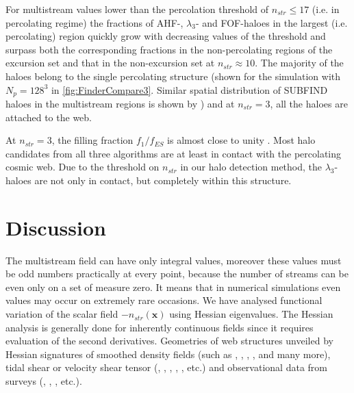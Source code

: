 For multistream values lower than the percolation threshold of $n_{str} \le 17$ (i.e. in percolating regime) the fractions of AHF-, $\lambda_3$-  and FOF-haloes in the largest (i.e. percolating) region quickly grow with decreasing values of the threshold and surpass both the corresponding fractions in the non-percolating  regions of the excursion set and that in the non-excursion set
at $n_{str} \approx 10$. The majority of the haloes belong to the single percolating structure (shown for the simulation with $N_p=128^3$ in \autoref{fig:FinderCompare3}. Similar spatial distribution of SUBFIND haloes \citealt{Springel2001a} in the multistream regions is shown by \citealt{Aragon-Calvo2016}) and at $n_{str} = 3$, all the haloes are attached to the web.  

At $n_{str} = 3$, the filling fraction $f_1 / f_{ES}$ is almost close to unity \cite{Ramachandra2017}. Most halo candidates from all three algorithms are at least in contact with the percolating cosmic web. Due to the threshold on $n_{str}$ in our halo detection method, the $\lambda_3$-haloes are not only in contact, but completely within this structure. 



\section{Discussion}
\label{sec:discussion}



The multistream field can have only integral  values, moreover these values must be odd numbers practically at every point, because the number of streams can be even only on a set of measure zero. It means that in numerical simulations  even values may occur on extremely rare occasions. 
We have analysed functional variation of the scalar field $-n_{str}(\mathbf{x})$ using Hessian eigenvalues. The Hessian analysis is generally done for inherently continuous fields since it requires  evaluation of the second derivatives. %
Geometries of web structures unveiled by Hessian signatures of smoothed density fields (such as \citealt{Sousbie2008a}, \citealt{Aragon-Calvo2007}, \citealt{Aragon-Calvo2010a}, \citealt{Cautun2014a}, \citealt{Bond2010a} and many more), tidal shear or velocity shear tensor (\citealt{Hahn2007}, \citealt{Forero-Romero2009a}, \citealt{Hoffman2012a}, \citealt{Hoffman2012a}, \citealt{Libeskind2013}, \citealt{Cautun2014a} etc.) and observational data from surveys (\citealt{Sousbie2008a}, \citealt{Bond2010a}, \citealt{Bond2010b}, \citealt{Pahwa2016} etc.). 


